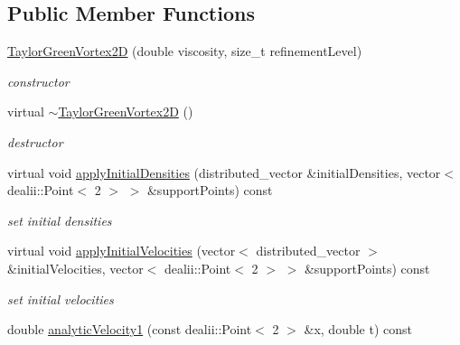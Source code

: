 \subsection*{Public Member Functions}
\begin{DoxyCompactItemize}
\item 
\hyperlink{classnatrium_1_1TaylorGreenVortex2D_a6160a6776bc13cd049945a9bbb502b6f}{Taylor\-Green\-Vortex2\-D} (double viscosity, size\-\_\-t refinement\-Level)
\begin{DoxyCompactList}\small\item\em constructor \end{DoxyCompactList}\item 
\hypertarget{classnatrium_1_1TaylorGreenVortex2D_abb6099f4f9791f7decabb35ccd3dbe49}{virtual \hyperlink{classnatrium_1_1TaylorGreenVortex2D_abb6099f4f9791f7decabb35ccd3dbe49}{$\sim$\-Taylor\-Green\-Vortex2\-D} ()}\label{classnatrium_1_1TaylorGreenVortex2D_abb6099f4f9791f7decabb35ccd3dbe49}

\begin{DoxyCompactList}\small\item\em destructor \end{DoxyCompactList}\item 
virtual void \hyperlink{classnatrium_1_1TaylorGreenVortex2D_a4ce91370c76ec68a7593c7c99bfd37a7}{apply\-Initial\-Densities} (distributed\-\_\-vector \&initial\-Densities, vector$<$ dealii\-::\-Point$<$ 2 $>$ $>$ \&support\-Points) const 
\begin{DoxyCompactList}\small\item\em set initial densities \end{DoxyCompactList}\item 
virtual void \hyperlink{classnatrium_1_1TaylorGreenVortex2D_a271d4dc6bba9b162f96f593296b06e1d}{apply\-Initial\-Velocities} (vector$<$ distributed\-\_\-vector $>$ \&initial\-Velocities, vector$<$ dealii\-::\-Point$<$ 2 $>$ $>$ \&support\-Points) const 
\begin{DoxyCompactList}\small\item\em set initial velocities \end{DoxyCompactList}\item 
\hypertarget{classnatrium_1_1TaylorGreenVortex2D_a86952afeffa9d8c9d7da62c1a0dddf1f}{double \hyperlink{classnatrium_1_1TaylorGreenVortex2D_a86952afeffa9d8c9d7da62c1a0dddf1f}{analytic\-Velocity1} (const dealii\-::\-Point$<$ 2 $>$ \&x, double t) const }\label{classnatrium_1_1TaylorGreenVortex2D_a86952afeffa9d8c9d7da62c1a0dddf1f}


\end{DoxyCompactItemize}
